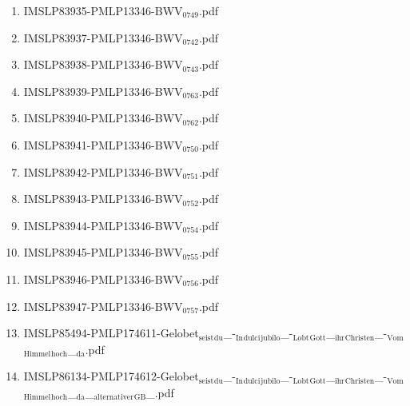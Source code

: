 \documentclass[11pt]{article}
\begin{document}
\begin{enumerate}
\begin{enumerate}
\begin{enumerate}
\begin{enumerate}
\item IMSLP83935-PMLP13346-BWV$_{\text{0749}}$.pdf
\label{sec-1-1-1-1-44-6-4-1-17-6}

\item IMSLP83937-PMLP13346-BWV$_{\text{0742}}$.pdf
\label{sec-1-1-1-1-44-6-4-1-17-7}

\item IMSLP83938-PMLP13346-BWV$_{\text{0743}}$.pdf
\label{sec-1-1-1-1-44-6-4-1-17-8}

\item IMSLP83939-PMLP13346-BWV$_{\text{0763}}$.pdf
\label{sec-1-1-1-1-44-6-4-1-17-9}

\item IMSLP83940-PMLP13346-BWV$_{\text{0762}}$.pdf
\label{sec-1-1-1-1-44-6-4-1-17-10}

\item IMSLP83941-PMLP13346-BWV$_{\text{0750}}$.pdf
\label{sec-1-1-1-1-44-6-4-1-17-11}

\item IMSLP83942-PMLP13346-BWV$_{\text{0751}}$.pdf
\label{sec-1-1-1-1-44-6-4-1-17-12}

\item IMSLP83943-PMLP13346-BWV$_{\text{0752}}$.pdf
\label{sec-1-1-1-1-44-6-4-1-17-13}

\item IMSLP83944-PMLP13346-BWV$_{\text{0754}}$.pdf
\label{sec-1-1-1-1-44-6-4-1-17-14}

\item IMSLP83945-PMLP13346-BWV$_{\text{0755}}$.pdf
\label{sec-1-1-1-1-44-6-4-1-17-15}

\item IMSLP83946-PMLP13346-BWV$_{\text{0756}}$.pdf
\label{sec-1-1-1-1-44-6-4-1-17-16}

\item IMSLP83947-PMLP13346-BWV$_{\text{0757}}$.pdf
\label{sec-1-1-1-1-44-6-4-1-17-17}

\item IMSLP85494-PMLP174611-Gelobet$_{\text{seist}}$$_{\text{du}}$\_-$_{\text{In}}$$_{\text{dulci}}$$_{\text{jubilo}}$\_-$_{\text{Lobt}}$$_{\text{Gott}}$\_$_{\text{ihr}}$$_{\text{Christen}}$\_-$_{\text{Vom}}$$_{\text{Himmel}}$$_{\text{hoch}}$\_$_{\text{da}}$.pdf
\label{sec-1-1-1-1-44-6-4-1-17-18}

\item IMSLP86134-PMLP174612-Gelobet$_{\text{seist}}$$_{\text{du}}$\_-$_{\text{In}}$$_{\text{dulci}}$$_{\text{jubilo}}$\_-$_{\text{Lobt}}$$_{\text{Gott}}$\_$_{\text{ihr}}$$_{\text{Christen}}$\_-$_{\text{Vom}}$$_{\text{Himmel}}$$_{\text{hoch}}$\_$_{\text{da}}$\_$_{\text{alternativer}}$$_{\text{GB}}$\_.pdf
\label{sec-1-1-1-1-44-6-4-1-17-19}


\end{enumerate}
\end{enumerate}
\end{enumerate}
\end{enumerate}
\end{document}
